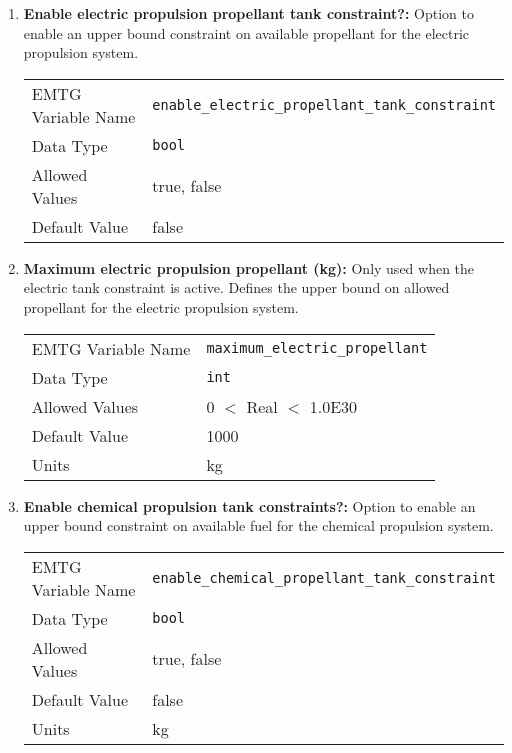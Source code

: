 \begin{enumerate}
    \item \textbf{Enable electric propulsion propellant tank constraint?:} Option to enable an upper bound constraint on available propellant for the electric propulsion system.
    \begin{table}[H]
        \hspace{2cm}
        \begin{tabular}{lp{5cm}}
        \ac{EMTG} Variable Name & \verb|enable_electric_propellant_tank_constraint| \\
        Data Type & \verb|bool| \\
        Allowed Values & true, false \\
        Default Value & false \\
        \end{tabular}
    \end{table}
    
    \item \textbf{Maximum electric propulsion propellant (kg):} Only used when the electric tank constraint is active. Defines the upper bound on allowed propellant for the electric propulsion system.
    \begin{table}[H]
        \hspace{2cm}
        \begin{tabular}{lp{5cm}}
        \ac{EMTG} Variable Name & \verb|maximum_electric_propellant| \\
        Data Type & \verb|int| \\
        Allowed Values & $0$ $<$ Real $<$ 1.0E30 \\
        Default Value & 1000 \\
        Units & kg
        \end{tabular}
    \end{table}
    
    \item \textbf{Enable chemical propulsion tank constraints?:} Option to enable an upper bound constraint on available fuel for the chemical propulsion system.
    \begin{table}[H]
        \hspace{2cm}
        \begin{tabular}{lp{5cm}}
        \ac{EMTG} Variable Name & \verb|enable_chemical_propellant_tank_constraint| \\
        Data Type & \verb|bool| \\
        Allowed Values & true, false \\
        Default Value & false \\
        Units & kg
        \end{tabular}
    \end{table}
    

\end{enumerate}
